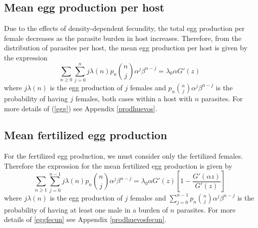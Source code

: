 \documentclass[bimj,fleqn]{w-art}
\theoremstyle{plain}
\theoremstyle{definition}
\begin{document}
\subsection{Mean egg production per host}
Due to the effects of density-dependent fecundity, the total egg production per female decreases as the parasite burden in host increases.
Therefore, from the distribution of parasites per host, the mean egg production per host %
is given by the expression
\begin{equation}\label{egg}
\sum_{n\geq 0}\sum_{j=0}^{n}j\lambda(n)p_n\binom{n}{j}\alpha^j\beta^{n-j}=\lambda_0\alpha G'(z)
\end{equation}
where $j\lambda(n)$ is the egg production of $j$ females and $p_n\binom{n}{j}\alpha^j\beta^{n-j}$ is the probability of having $j$ females, both cases within a host with $n$ parasites. For more details of (\ref{egg}) see Appendix \eqref{prodhuevos}.

\subsection{Mean fertilized egg production}
For the fertilized egg production, we must consider only the fertilized females. Therefore the expression for the mean fertilized egg production is given by
\begin{equation}\label{eggfecun}
\sum_{n\geq 1}\sum_{j=0}^{n-1}j\lambda(n)p_n\binom{n}{j}\alpha^j\beta^{n-j}=
\lambda_0 \alpha G'(z) \left[1-\frac{ G'(\alpha z)}{G'(z)}\right]  
\end{equation}
where
$j\lambda(n)$ is the egg production of $j$ females and $\sum_{j=0}^{n-1} p_n\binom{n}{j}\alpha^j\beta^{n-j}$ is the probability 
of having at least one male in a burden of $n$ parasites.
For more details of \eqref{eggfecun} see Appendix \eqref{prodhuevosfecun}.

\end{document}
